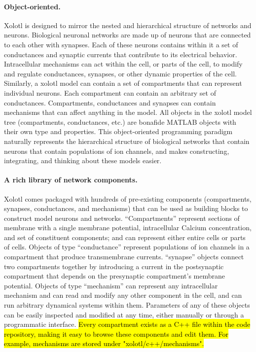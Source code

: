 \documentclass{frontiersSCNS} %
\begin{document}
\paragraph{Object-oriented.}
Xolotl is designed to mirror the nested and hierarchical structure of networks and neurons. Biological neuronal networks are made up of neurons that are connected to each other with synapses. Each of these neurons contains within it a set of conductances and synaptic currents that contribute to its electrical behavior. Intracellular mechanisms can act within the cell, or parts of the cell, to modify and regulate conductances, synapses, or other dynamic properties of the cell. Similarly, a xolotl model can contain a set of compartments that can represent individual neurons. Each compartment can contain an arbitrary set of conductances. Compartments, conductances and synapses can contain mechanisms that can affect anything in the model. All objects in the xolotl model tree (compartments, conductances, etc.) are bonafide MATLAB objects with their own type and properties. This object-oriented programming paradigm naturally represents the hierarchical structure of biological networks that contain neurons that contain populations of ion channels, and makes constructing, integrating, and thinking about these models easier.


\paragraph{A rich library of network components.} Xolotl comes packaged with hundreds of pre-existing components (compartments, synapses, conductances, and mechanisms) that can be used as building blocks to construct model neurons and networks. ``Compartments'' represent sections of membrane with a single membrane potential, intracellular Calcium concentration, and set of constituent components; and can represent either entire cells or parts of cells. Objects of type ``conductance'' represent populations of ion channels in a compartment that produce transmembrane currents. ``synapse'' objects connect two compartments together by introducing a current in the postsynaptic compartment that depends on the presynaptic compartment's membrane potential. Objects of type ``mechanism'' can represent any intracellular mechanism and can read and modify any other component in the cell, and can run arbitrary dynamical systems within them. Parameters of any of these objects can be easily inspected and modified at any time, either manually or through a programmatic interface. \hl{Every compartment exists as a C++ file within the code repository, making it easy to browse these components and edit them. For example, mechanisms are stored under "xolotl/c++/mechanisms". }
\end{document}
